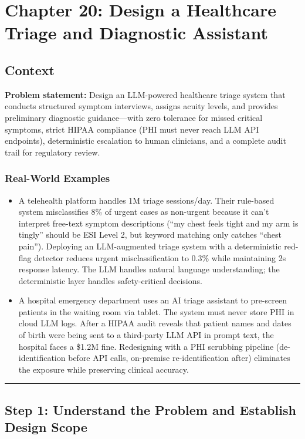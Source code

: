 \chapter{Chapter 20: Design a Healthcare Triage and Diagnostic Assistant}

\section*{Context}
\textbf{Problem statement:} Design an LLM-powered healthcare triage system that conducts structured symptom interviews, assigns acuity levels, and provides preliminary diagnostic guidance---with zero tolerance for missed critical symptoms, strict HIPAA compliance (PHI must never reach LLM API endpoints), deterministic escalation to human clinicians, and a complete audit trail for regulatory review.

\subsection*{Real-World Examples}
\begin{itemize}
  \item A telehealth platform handles 1M triage sessions/day. Their rule-based system misclassifies 8\% of urgent cases as non-urgent because it can't interpret free-text symptom descriptions (``my chest feels tight and my arm is tingly'' should be ESI Level 2, but keyword matching only catches ``chest pain''). Deploying an LLM-augmented triage system with a deterministic red-flag detector reduces urgent misclassification to 0.3\% while maintaining 2s response latency. The LLM handles natural language understanding; the deterministic layer handles safety-critical decisions.
  \item A hospital emergency department uses an AI triage assistant to pre-screen patients in the waiting room via tablet. The system must never store PHI in cloud LLM logs. After a HIPAA audit reveals that patient names and dates of birth were being sent to a third-party LLM API in prompt text, the hospital faces a \$1.2M fine. Redesigning with a PHI scrubbing pipeline (de-identification before API calls, on-premise re-identification after) eliminates the exposure while preserving clinical accuracy.
\end{itemize}

\bigskip\hrule\bigskip

\section*{Step 1: Understand the Problem and Establish Design Scope}

